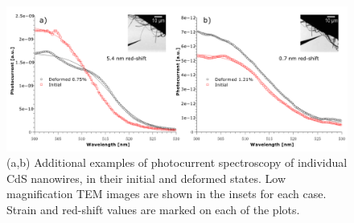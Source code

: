 \begin{figure}  
\includegraphics[width=\textwidth]{figures/figure6_s3}
\caption[Photocurrent spectroscopy of deformed CdS NW]
{(a,b) Additional examples of photocurrent spectroscopy of individual CdS nanowires, in their initial and deformed states. Low magnification TEM images are shown in the insets for each case. Strain and red-shift values are marked on each of the plots. 
\label{fig:6_s3}}
\end{figure}


